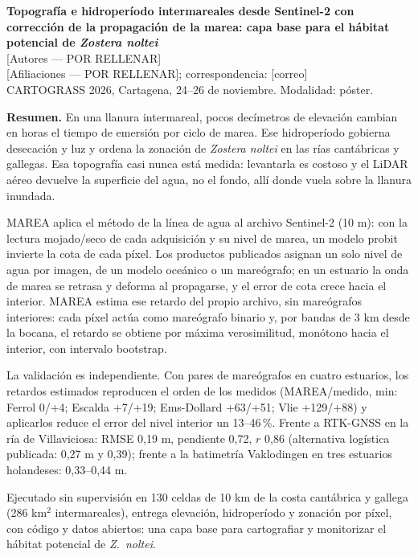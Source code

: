\documentclass[11pt,a4paper]{article}
\begin{document}

\begin{center}
{\large\bfseries Topografía e hidroperíodo intermareales desde Sentinel-2 con
corrección de la propagación de la marea: capa base para el hábitat potencial
de \emph{Zostera noltei}}\\[0.5em]
[Autores --- POR RELLENAR]\\
{\small [Afiliaciones --- POR RELLENAR]; correspondencia: [correo]}\\[0.3em]
{\small CARTOGRASS 2026, Cartagena, 24--26 de noviembre. Modalidad: póster.}
\end{center}

\textbf{Resumen.} En una llanura intermareal, pocos decímetros de elevación
cambian en horas el tiempo de emersión por ciclo de marea. Ese hidroperíodo
gobierna desecación y luz y ordena la zonación de \emph{Zostera noltei} en
las rías cantábricas y gallegas. Esa topografía casi nunca está medida:
levantarla es costoso y el LiDAR aéreo devuelve la superficie del agua, no el
fondo, allí donde vuela sobre la llanura inundada.

MAREA aplica el método de la línea de agua al archivo Sentinel-2 (10 m): con
la lectura mojado/seco de cada adquisición y su nivel de marea, un modelo
probit invierte la cota de cada píxel. Los productos publicados asignan un
solo nivel de agua por imagen, de un modelo oceánico o un mareógrafo; en un
estuario la onda de marea se retrasa y deforma al propagarse, y el error de
cota crece hacia el interior. MAREA estima ese retardo del propio archivo, sin
mareógrafos interiores: cada píxel actúa como mareógrafo binario y, por bandas
de 3 km desde la bocana, el retardo se obtiene por máxima verosimilitud,
monótono hacia el interior, con intervalo bootstrap.

La validación es independiente. Con pares de mareógrafos en cuatro estuarios,
los retardos estimados reproducen el orden de los medidos (MAREA/medido, min:
Ferrol 0/+4; Escalda +7/+19; Ems-Dollard +63/+51; Vlie +129/+88) y aplicarlos
reduce el error del nivel interior un 13--46\,\%. Frente a RTK-GNSS en la
ría de Villaviciosa: RMSE 0,19 m, pendiente 0,72, $r$ 0,86 (alternativa
logística publicada: 0,27 m y 0,39); frente a la batimetría Vaklodingen en
tres estuarios holandeses: 0,33--0,44 m.

Ejecutado sin supervisión en 130 celdas de 10 km de la costa cantábrica y
gallega (286 km$^2$ intermareales), entrega elevación, hidroperíodo y zonación
por píxel, con código y datos abiertos: una capa base para
cartografiar y monitorizar el hábitat potencial de \emph{Z.\ noltei}.
\end{document}
